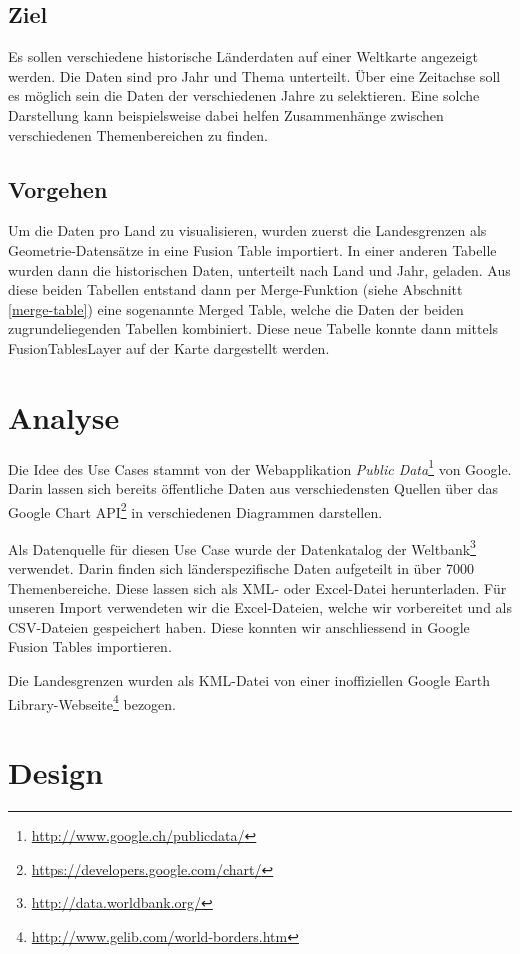 \subsection{Ziel}
Es sollen verschiedene historische Länderdaten auf einer Weltkarte angezeigt werden. Die Daten sind pro Jahr und Thema unterteilt. Über eine Zeitachse soll es möglich sein die Daten der verschiedenen Jahre zu selektieren. Eine solche Darstellung kann beispielsweise dabei helfen Zusammenhänge zwischen verschiedenen Themenbereichen zu finden.

\subsection{Vorgehen}
\label{worlddata-vorgehen}
Um die Daten pro Land zu visualisieren, wurden zuerst die Landesgrenzen als Geometrie-Datensätze in eine Fusion Table importiert. In einer anderen Tabelle wurden dann die historischen Daten, unterteilt nach Land und Jahr, geladen. Aus diese beiden Tabellen entstand dann per \gls{Merge}-Funktion (siehe Abschnitt \ref{merge-table}) eine sogenannte Merged Table, welche die Daten der beiden zugrundeliegenden Tabellen kombiniert. Diese neue Tabelle konnte dann mittels FusionTablesLayer auf der Karte dargestellt werden.

\section{Analyse}
Die Idee des Use Cases stammt von der Webapplikation \emph{Public Data}\footnote{\url{http://www.google.ch/publicdata/}} von Google. Darin lassen sich bereits öffentliche Daten aus verschiedensten Quellen über das Google Chart \gls{API}\footnote{\url{https://developers.google.com/chart/}} in verschiedenen Diagrammen darstellen.

Als Datenquelle für diesen Use Case wurde der Datenkatalog der Weltbank\footnote{\url{http://data.worldbank.org/}} verwendet. Darin finden sich länderspezifische Daten aufgeteilt in über 7000 Themenbereiche. Diese lassen sich als \gls{XML}- oder Excel-Datei herunterladen. Für unseren Import verwendeten wir die Excel-Dateien, welche wir vorbereitet und als \gls{CSV}-Dateien gespeichert haben. Diese konnten wir anschliessend in Google Fusion Tables importieren.

Die Landesgrenzen wurden als \gls{KML}-Datei von einer inoffiziellen Google Earth Library-Webseite\footnote{\url{http://www.gelib.com/world-borders.htm}} bezogen. 

\section{Design}

